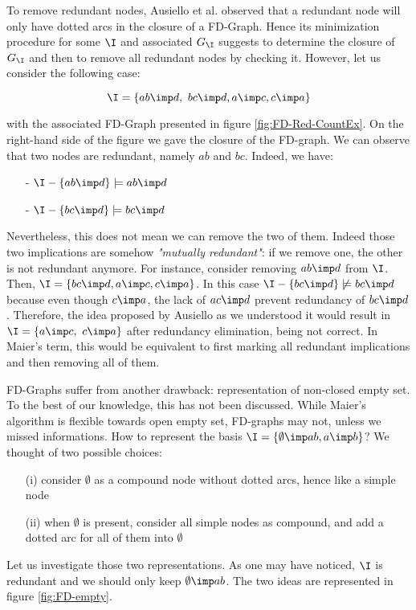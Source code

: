 To remove redundant nodes, Ausiello et al. observed that a redundant node will
only have dotted arcs in the closure of a FD-Graph. Hence its minimization procedure for some $\I$ and associated $G_{\I}$ suggests to determine the closure of $G_{\I}$ and then to remove all redundant nodes by checking it. However, let us consider the following case:

\[ \I = \{ ab \imp d, \ bc \imp d, a \imp c, c \imp a \} \]

with the associated FD-Graph presented in figure \ref{fig:FD-Red-CountEx}. On the right-hand side of the figure we gave the closure of the FD-graph. We can
observe that two nodes are redundant, namely $ab$ and $bc$. Indeed, we have:
\begin{itemize}
	\item[-] $\I - \{ab \imp d \} \models ab \imp d$
	\item[-] $\I - \{bc \imp d \} \models bc \imp d$
\end{itemize}
\noindent Nevertheless, this does not mean we can remove the two of them. Indeed
those two implications are somehow \textit{"mutually redundant"}: if we remove
one, the other is not redundant anymore. For instance, consider removing $ab \imp d$ from $\I$. Then, $\I = \{ bc \imp d, a \imp c, c \imp a \}$. In this
case $\I - \{bc \imp d \} \not\models bc \imp d$ because even though $c \imp a$,
the lack of $ac \imp d$ prevent redundancy of $bc \imp d$. Therefore, the idea
proposed by Ausiello as we understood it would result in $\I = \{ a \imp c, \ c \imp a \}$ after redundancy elimination, being not correct. In Maier's term, this would be equivalent to first marking all redundant implications and then
removing all of them.

\begin{figure}[ht]
	
\end{figure}

\vspace{1.2em}

FD-Graphs suffer from another drawback: representation of non-closed empty set.
To the best of our knowledge, this has not been discussed. While Maier's algorithm is flexible towards open empty set, FD-graphs may not, unless we missed informations. How to represent the basis $\I = \{ \emptyset \imp ab, a \imp b\}$? We thought of two possible choices:
\begin{itemize}
	\item[(i)] consider $\emptyset$ as a compound node without dotted arcs,
	hence like a simple node
	\item[(ii)] when $\emptyset$ is present, consider all simple nodes as 
	compound, and add a dotted arc for all of them into $\emptyset$
\end{itemize}
Let us investigate those two representations. As one may have noticed, $\I$
is redundant and we should only keep $\emptyset \imp ab$. The two ideas
are represented in figure \ref{fig:FD-empty}.

